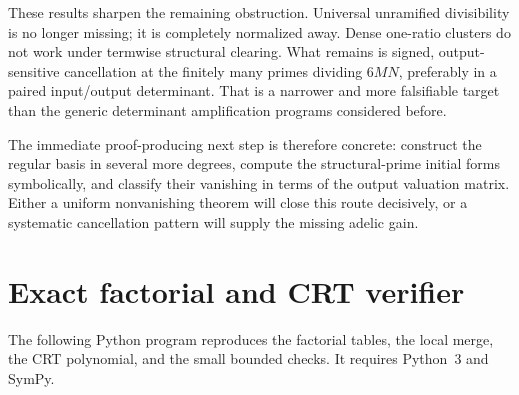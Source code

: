 \documentclass[11pt,oneside]{article}
\theoremstyle{definition}
\theoremstyle{remark}
\begin{document}
These results sharpen the remaining obstruction.  Universal unramified divisibility is no
longer missing; it is completely normalized away.  Dense one-ratio clusters do not work under
termwise structural clearing.  What remains is signed, output-sensitive cancellation at the
finitely many primes dividing \(6MN\), preferably in a paired input/output determinant.  That
is a narrower and more falsifiable target than the generic determinant amplification programs
considered before.

The immediate proof-producing next step is therefore concrete: construct the regular basis in
several more degrees, compute the structural-prime initial forms symbolically, and classify
their vanishing in terms of the output valuation matrix.  Either a uniform nonvanishing theorem
will close this route decisively, or a systematic cancellation pattern will supply the missing
adelic gain.

\appendix

\section{Exact factorial and CRT verifier}
\label{app:code}

The following Python program reproduces the factorial tables, the local merge, the CRT
polynomial, and the small bounded checks.  It requires Python~3 and SymPy.
\end{document}
